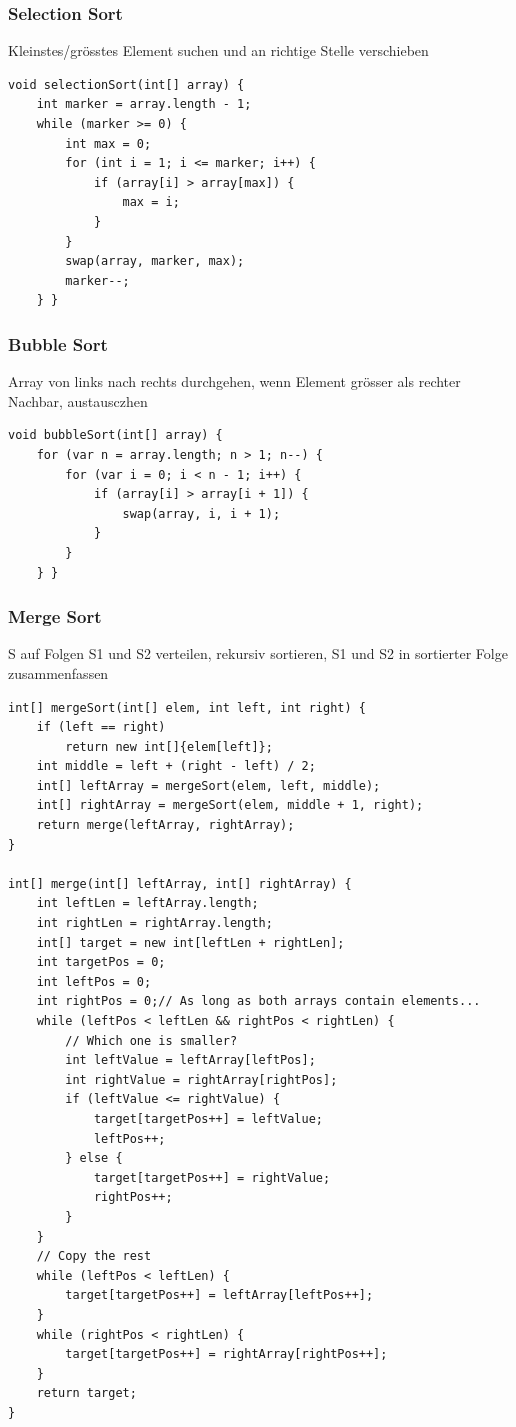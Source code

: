 \begin{multicols*}{4}
		\subsubsection{Selection Sort}
		Kleinstes/grösstes Element suchen und an richtige Stelle verschieben
		
			\begin{lstlisting}
void selectionSort(int[] array) {
	int marker = array.length - 1;
	while (marker >= 0) {
		int max = 0;
		for (int i = 1; i <= marker; i++) {
			if (array[i] > array[max]) {
				max = i;
			}
		}
		swap(array, marker, max);
		marker--;
	} }
			\end{lstlisting}
		
		\subsubsection{Bubble Sort}
		Array von links nach rechts durchgehen, wenn Element grösser als rechter Nachbar, austausczhen
			\begin{lstlisting}
void bubbleSort(int[] array) {
	for (var n = array.length; n > 1; n--) {
		for (var i = 0; i < n - 1; i++) {
			if (array[i] > array[i + 1]) {
				swap(array, i, i + 1);
			}
		}
	} }
			\end{lstlisting}
		
		\subsubsection{Merge Sort}
		S auf Folgen S1 und S2 verteilen, rekursiv sortieren, S1 und S2 in sortierter Folge zusammenfassen
			\begin{lstlisting}
int[] mergeSort(int[] elem, int left, int right) {
	if (left == right)
	  	return new int[]{elem[left]};
	int middle = left + (right - left) / 2;
	int[] leftArray = mergeSort(elem, left, middle);
	int[] rightArray = mergeSort(elem, middle + 1, right);
	return merge(leftArray, rightArray);
}

int[] merge(int[] leftArray, int[] rightArray) {
	int leftLen = leftArray.length;
	int rightLen = rightArray.length;
	int[] target = new int[leftLen + rightLen];
	int targetPos = 0;
	int leftPos = 0;
	int rightPos = 0;// As long as both arrays contain elements...
	while (leftPos < leftLen && rightPos < rightLen) {
		// Which one is smaller?
		int leftValue = leftArray[leftPos];
		int rightValue = rightArray[rightPos];
		if (leftValue <= rightValue) {
			target[targetPos++] = leftValue;
			leftPos++;
		} else {
			target[targetPos++] = rightValue;
			rightPos++;
		}
	}
    // Copy the rest
	while (leftPos < leftLen) {
		target[targetPos++] = leftArray[leftPos++];
	}
	while (rightPos < rightLen) {
		target[targetPos++] = rightArray[rightPos++];
	}
	return target;
}
			\end{lstlisting}
		

\end{multicols*}
